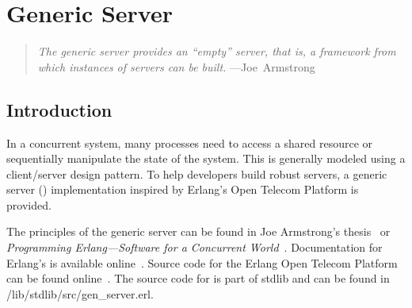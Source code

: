 %
%
%

\chapter {Generic Server}\label{chap:gen-server}

\begin{quote}
  \emph{The generic server provides an ``empty'' server, that is, a
  framework from which instances of servers can be
  built.} \hfill ---Joe~Armstrong~\cite{armstrong-thesis}
\end{quote}

\section {Introduction}

In a concurrent system, many processes need to access a shared
resource or sequentially manipulate the state of the system. This is
generally modeled using a client/server design pattern. To help
developers build robust servers, a generic server
() implementation inspired by Erlang's Open Telecom
Platform is provided.

The principles of the generic server can be found in Joe Armstrong's
thesis~\cite{armstrong-thesis} or \emph{Programming Erlang---Software
  for a Concurrent World}~\cite{programming-erlang}. Documentation for
Erlang's  is available
online~\cite{gen-server-ref}. Source code for the Erlang Open Telecom
Platform can be found online~\cite{erlang}. The source code for
 is part of stdlib and can be found in
/lib/stdlib/src/gen\_server.erl.

